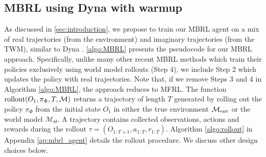 \subsection{MBRL using Dyna with warmup}
\label{sec:dyna}
\label{sec:warmup}

As discussed in \cref{sec:introduction}, we propose to train our MBRL agent on a mix of real trajectories (from the environment) and imaginary trajectories (from the TWM), similar to Dyna \citep{sutton1990integrated}.
\cref{algo:MBRL} presents the pseudocode for our MBRL approach.
Specifically, unlike many other recent MBRL methods \citep{Ha2018, micheli2022transformers, micheli2024efficient, hafner2020mastering, hafner2023mastering} which train their policies exclusively using world model rollouts (Step 4), we include Step 2 which updates the policy with real trajectories.
Note that, if we remove Steps 3 and 4 in Algorithm \ref{algo:MBRL}, the approach reduces to MFRL.
The function $\text{rollout}(O_1, \pi_{\Phi},  T, \mathcal{M})$ returns a trajectory of length $T$ generated by rolling out the policy $\pi_{\Phi}$ from the initial state $O_1$ in either the true environment $\operatorname*{\mathcal{M}_{\text{env}}}$ or the world model $\mathcal{M}_{\Theta}$.
A trajectory contains collected observations, actions and rewards during the rollout $\tau = (O_{1:T+1}, a_{1:T}, r_{1:T})$.
Algorithm \ref{algo:rollout} in Appendix \ref{ap:mbrl_agent} details the rollout procedure.
We discuss other design choices below. 

